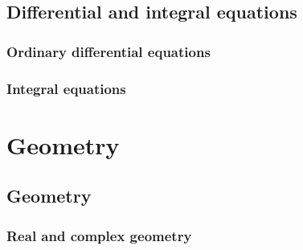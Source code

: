 \documentclass[a4paper]{book}
\begin{document}
	\chapter{Differential and integral equations}

    \section{Ordinary differential equations}

    
    

    \section{Integral equations}

    
    
    
	
	

    \part{Geometry}

    \chapter{Geometry}

    \section{Real and complex geometry}
    
	
	
	
\end{document}
